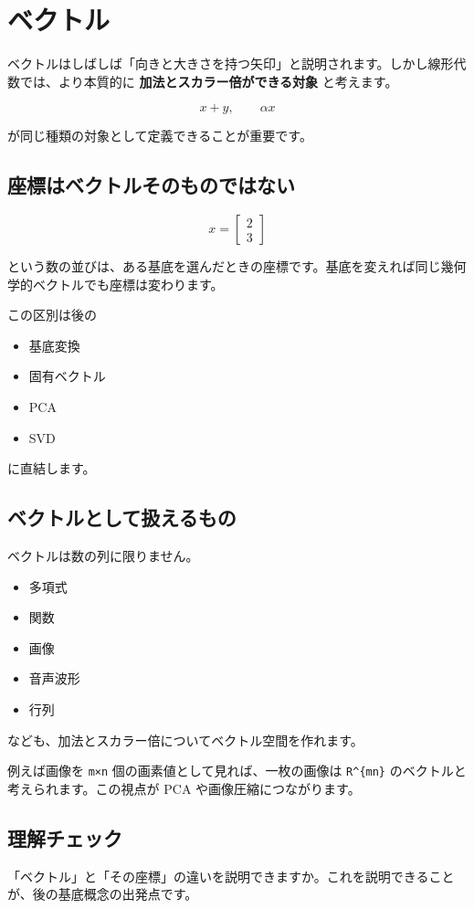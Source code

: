 \documentclass[
  11pt,
  a4paper,
]{ltjsarticle}
\author{}
\date{}
\providecommand{\tightlist}{%
  \setlength{\itemsep}{0pt}\setlength{\parskip}{0pt}}
\begin{document}
\hypertarget{ux30d9ux30afux30c8ux30eb}{%
\section{ベクトル}\label{ux30d9ux30afux30c8ux30eb}}

ベクトルはしばしば「向きと大きさを持つ矢印」と説明されます。しかし線形代数では、より本質的に
\textbf{加法とスカラー倍ができる対象} と考えます。

\[
x+y,\qquad \alpha x
\]

が同じ種類の対象として定義できることが重要です。

\hypertarget{ux5ea7ux6a19ux306fux30d9ux30afux30c8ux30ebux305dux306eux3082ux306eux3067ux306fux306aux3044}{%
\subsection{座標はベクトルそのものではない}\label{ux5ea7ux6a19ux306fux30d9ux30afux30c8ux30ebux305dux306eux3082ux306eux3067ux306fux306aux3044}}

\[
x=\begin{bmatrix}2\\3\end{bmatrix}
\]

という数の並びは、ある基底を選んだときの座標です。基底を変えれば同じ幾何学的ベクトルでも座標は変わります。

この区別は後の

\begin{itemize}
\tightlist
\item
  基底変換
\item
  固有ベクトル
\item
  PCA
\item
  SVD
\end{itemize}

に直結します。

\hypertarget{ux30d9ux30afux30c8ux30ebux3068ux3057ux3066ux6271ux3048ux308bux3082ux306e}{%
\subsection{ベクトルとして扱えるもの}\label{ux30d9ux30afux30c8ux30ebux3068ux3057ux3066ux6271ux3048ux308bux3082ux306e}}

ベクトルは数の列に限りません。

\begin{itemize}
\tightlist
\item
  多項式
\item
  関数
\item
  画像
\item
  音声波形
\item
  行列
\end{itemize}

なども、加法とスカラー倍についてベクトル空間を作れます。

例えば画像を \texttt{m×n} 個の画素値として見れば、一枚の画像は
\texttt{R\^{}\{mn\}} のベクトルと考えられます。この視点が PCA
や画像圧縮につながります。

\hypertarget{ux7406ux89e3ux30c1ux30a7ux30c3ux30af}{%
\subsection{理解チェック}\label{ux7406ux89e3ux30c1ux30a7ux30c3ux30af}}

「ベクトル」と「その座標」の違いを説明できますか。これを説明できることが、後の基底概念の出発点です。
\end{document}
